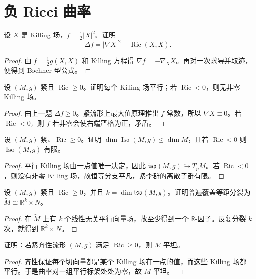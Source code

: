 \documentclass[11pt,a4paper,openany]{ctexbook}
\numberwithin{equation}{chapter}
\begin{document}
\section{负 Ricci 曲率}

\begin{problem}
设 \(X\) 是 Killing 场，\(f=\frac12|X|^2\)。证明
\[
\Delta f=|\nabla X|^2-\operatorname{Ric}(X,X).
\]
\end{problem}
\begin{proof}
由 \(f=\frac12g(X,X)\) 和 Killing 方程得 \(\nabla f=-\nabla_XX\)。再对一次求导并取迹，便得到 Bochner 型公式。
\end{proof}

\begin{problem}
设 \((M,g)\) 紧且 \(\operatorname{Ric}\ge 0\)。证明每个 Killing 场平行；若 \(\operatorname{Ric}<0\)，则无非零 Killing 场。
\end{problem}
\begin{proof}
由上一题 \(\Delta f\ge 0\)。紧流形上最大值原理推出 \(f\) 常数，所以 \(\nabla X\equiv 0\)。若 \(\operatorname{Ric}<0\)，则 \(f\) 若非零会使右端严格为正，矛盾。
\end{proof}

\begin{problem}
设 \((M,g)\) 紧、\(\operatorname{Ric}\ge 0\)。证明 \(\dim\operatorname{Iso}(M,g)\le \dim M\)，且若 \(\operatorname{Ric}<0\) 则 \(\operatorname{Iso}(M,g)\) 有限。
\end{problem}
\begin{proof}
平行 Killing 场由一点值唯一决定，因此 \(\mathfrak{iso}(M,g)\hookrightarrow T_pM\)。若 \(\operatorname{Ric}<0\)，则没有非零 Killing 场，故恒等分支平凡，紧李群的离散子群有限。
\end{proof}

\begin{problem}
设 \((M,g)\) 紧且 \(\operatorname{Ric}\ge 0\)，并且 \(k=\dim\mathfrak{iso}(M,g)\)。证明普遍覆盖等距分裂为 \(\widetilde M\cong \mathbb R^k\times N\)。
\end{problem}
\begin{proof}
在 \(\widetilde M\) 上有 \(k\) 个线性无关平行向量场，故至少得到一个 \(\mathbb R\)-因子。反复分裂 \(k\) 次，就得到 \(\mathbb R^k\times N\)。
\end{proof}

\begin{problem}
证明：若紧齐性流形 \((M,g)\) 满足 \(\operatorname{Ric}\ge 0\)，则 \(M\) 平坦。
\end{problem}
\begin{proof}
齐性保证每个切向量都是某个 Killing 场在一点的值，而这些 Killing 场都平行。于是曲率对一组平行标架处处为零，故 \(M\) 平坦。
\end{proof}
\end{document}
